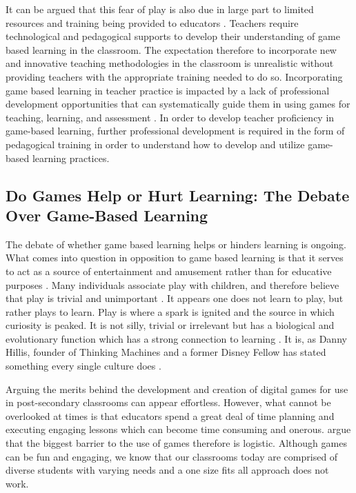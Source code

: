 \documentclass[10pt]{article}
\begin{document}
It can be argued that this fear of play is also due in large part to limited resources and training being provided to educators \citep{fishman2014empowering}. Teachers require technological and pedagogical supports to develop their understanding of game based learning in the classroom. The expectation therefore to incorporate new and innovative teaching methodologies in the classroom is unrealistic without providing teachers with the appropriate training needed to do so. Incorporating game based learning in teacher practice is impacted by a lack of professional development opportunities that can systematically guide them in using games for teaching, learning, and assessment \citep{fishman2014empowering,ruggiero2013video,foster2020principles}. In order to develop teacher proficiency in game-based learning, further professional development is required in the form of pedagogical training in order to understand how to develop and utilize game-based learning practices.


\subsection{Do Games Help or Hurt Learning: The Debate Over Game-Based Learning}

The debate of whether game based learning helps or hinders learning is ongoing. What comes into question in opposition to game based learning is that it serves to act as a source of entertainment and amusement rather than for educative purposes \citep{lister2015gamification, mayer2010adding}. Many individuals associate play with children, and therefore believe that play is trivial and unimportant \citep{prensky2001fun}. It appears one does not learn to play, but rather plays to learn. Play is where a spark is ignited and the source in which curiosity is peaked. It is not silly, trivial or irrelevant but has a biological and evolutionary function which has a strong connection to learning \citep{prensky2001fun}. It is, as Danny Hillis, founder of Thinking Machines and a former Disney Fellow has stated something every single culture does \citep{prensky2001fun}.

Arguing the merits behind the development and creation of digital games for use in post-secondary classrooms can appear effortless. However, what cannot be overlooked at times is that educators spend a great deal of time planning and executing engaging lessons which can become time consuming and onerous. \citet{mckeachie2013mckeachie} argue that the biggest barrier to the use of games therefore is logistic. Although games can be fun and engaging, we know that our classrooms today are comprised of diverse students with varying needs and a one size fits all approach does not work.
\end{document}
